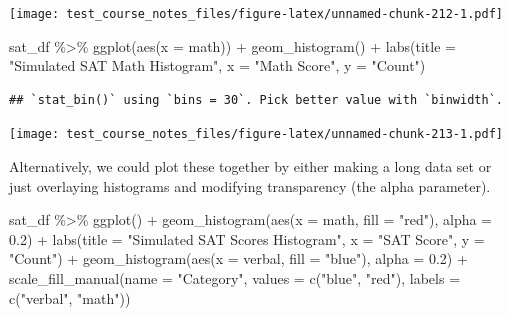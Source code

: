 \documentclass[
]{book}
\newenvironment{Shaded}{\begin{snugshade}}{\end{snugshade}}
\newcommand{\AttributeTok}[1]{\textcolor[rgb]{0.77,0.63,0.00}{#1}}
\newcommand{\FloatTok}[1]{\textcolor[rgb]{0.00,0.00,0.81}{#1}}
\newcommand{\FunctionTok}[1]{\textcolor[rgb]{0.00,0.00,0.00}{#1}}
\newcommand{\NormalTok}[1]{#1}
\newcommand{\SpecialCharTok}[1]{\textcolor[rgb]{0.00,0.00,0.00}{#1}}
\newcommand{\StringTok}[1]{\textcolor[rgb]{0.31,0.60,0.02}{#1}}
\begin{document}
\texttt{[image: test\_course\_notes\_files/figure-latex/unnamed-chunk-212-1.pdf]}

\begin{Shaded}
\begin{Highlighting}[]
\NormalTok{sat\_df }\SpecialCharTok{\%\textgreater{}\%} \FunctionTok{ggplot}\NormalTok{(}\FunctionTok{aes}\NormalTok{(}\AttributeTok{x =}\NormalTok{ math)) }\SpecialCharTok{+}
  \FunctionTok{geom\_histogram}\NormalTok{() }\SpecialCharTok{+}
  \FunctionTok{labs}\NormalTok{(}\AttributeTok{title =} \StringTok{"Simulated SAT Math Histogram"}\NormalTok{,}
       \AttributeTok{x =} \StringTok{"Math Score"}\NormalTok{,}
       \AttributeTok{y =} \StringTok{"Count"}\NormalTok{)}
\end{Highlighting}
\end{Shaded}

\begin{verbatim}
## `stat_bin()` using `bins = 30`. Pick better value with `binwidth`.
\end{verbatim}

\texttt{[image: test\_course\_notes\_files/figure-latex/unnamed-chunk-213-1.pdf]}

Alternatively, we could plot these together by either making a long data set or just overlaying histograms and modifying transparency (the alpha parameter).

\begin{Shaded}
\begin{Highlighting}[]
\NormalTok{sat\_df }\SpecialCharTok{\%\textgreater{}\%} \FunctionTok{ggplot}\NormalTok{() }\SpecialCharTok{+}
  \FunctionTok{geom\_histogram}\NormalTok{(}\FunctionTok{aes}\NormalTok{(}\AttributeTok{x =}\NormalTok{ math, }\AttributeTok{fill =} \StringTok{"red"}\NormalTok{), }\AttributeTok{alpha =} \FloatTok{0.2}\NormalTok{) }\SpecialCharTok{+}
  \FunctionTok{labs}\NormalTok{(}\AttributeTok{title =} \StringTok{"Simulated SAT Scores Histogram"}\NormalTok{,}
       \AttributeTok{x =} \StringTok{"SAT Score"}\NormalTok{,}
       \AttributeTok{y =} \StringTok{"Count"}\NormalTok{) }\SpecialCharTok{+}
  \FunctionTok{geom\_histogram}\NormalTok{(}\FunctionTok{aes}\NormalTok{(}\AttributeTok{x =}\NormalTok{ verbal, }\AttributeTok{fill =} \StringTok{"blue"}\NormalTok{), }\AttributeTok{alpha =} \FloatTok{0.2}\NormalTok{) }\SpecialCharTok{+}
  \FunctionTok{scale\_fill\_manual}\NormalTok{(}\AttributeTok{name =} \StringTok{"Category"}\NormalTok{, }\AttributeTok{values =} \FunctionTok{c}\NormalTok{(}\StringTok{"blue"}\NormalTok{, }\StringTok{"red"}\NormalTok{), }\AttributeTok{labels =} \FunctionTok{c}\NormalTok{(}\StringTok{"verbal"}\NormalTok{, }\StringTok{"math"}\NormalTok{))}
\end{Highlighting}
\end{Shaded}
\end{document}
